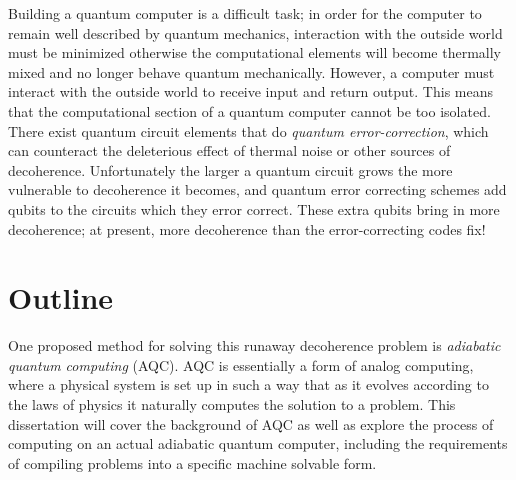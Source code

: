 Building a quantum computer is a difficult task;\cite{qc}\cite{qcbook} in order for the computer to remain well described by quantum mechanics, interaction with the outside world must be minimized otherwise the computational elements will become thermally mixed and no longer behave quantum mechanically.  However, a computer must interact with the outside world to receive input and return output.  This means that the computational section of a quantum computer cannot be too isolated.  There exist quantum circuit elements that do \emph{quantum error-correction}, which can counteract the deleterious effect of thermal noise or other sources of decoherence.  Unfortunately the larger a quantum circuit grows the more vulnerable to decoherence it becomes, and quantum error correcting schemes add qubits to the circuits which they error correct.  These extra qubits bring in more decoherence; at present, more decoherence than the error-correcting codes fix!

\section{Outline}
One proposed method for solving this runaway decoherence problem is \emph{adiabatic quantum computing} (AQC).\cite{farhi}  AQC is essentially a form of analog computing, where a physical system is set up in such a way that as it evolves according to the laws of physics it naturally computes the solution to a problem.  This dissertation will cover the background of AQC as well as explore the process of computing on an actual adiabatic quantum computer, including the requirements of compiling problems into a specific machine solvable form.
